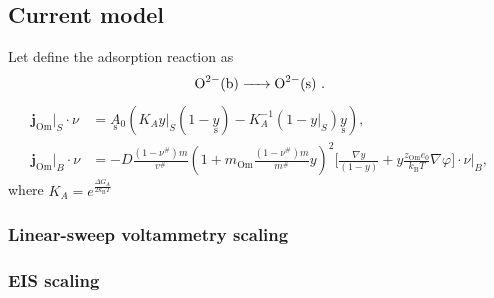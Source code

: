 \documentclass[a4 paper]{article}
\newcommand\kB{k_\mathrm{B}}
\newcommand\Om{\mathrm{Om}}
\newcommand\mL{m^\#}
\newcommand\vL{v^\#}
\newcommand\nuL{\nu^\#}
\newcommand{\us}[1]{\underset{\textrm{s}}{#1}{}}
\begin{document}
\subsection{Current model}
Let define the adsorption reaction as 
\begin{align}
    \ce{O^2-(b) -> O^2-(s)}~.
    \label{}
\end{align}
\begin{align}
    \mathbf{j}_\Om|_S\cdot\nu &= \us A_0 \left(K_A y|_S (1-\us y) -K_A^{-1} (1-y|_S)\us y  \right), \\
    \mathbf{j}_\Om|_B\cdot\nu &= - D \frac{(1 - \nuL)m}{\vL}
                        \left( 1 +m_\Om\frac{(1 - \nuL)m}{\mL} y \right)^2 
                    \Bigg[
                      \frac{\nabla y}{(1- y)}
                      +y \frac{z_{\Om} e_0}{\kB T} \nabla \varphi
                    \Bigg]\cdot\nu\Bigg|_B,
    \label{}
\end{align}
where $K_A = e^\frac{\Delta G_A}{2\kB T}$ 
\subsubsection{Linear-sweep voltammetry scaling}
\subsubsection{EIS scaling}
\end{document}
